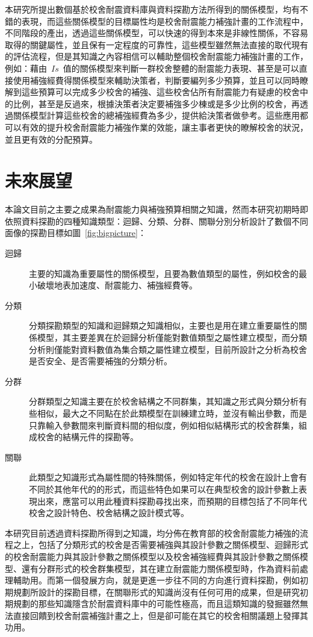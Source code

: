 本研究所提出數個基於校舍耐震資料庫與資料探勘方法所得到的關係模型，均有不錯的表現，而這些關係模型的目標屬性均是校舍耐震能力補強計畫的工作流程中，不同階段的產出，透過這些關係模型，可以快速的得到本來是非線性關係，不容易取得的關鍵屬性，並且保有一定程度的可靠性，這些模型雖然無法直接的取代現有的評估流程，但是其知識之內容相信可以輔助整個校舍耐震能力補強計畫的工作，例如：藉由~$Is$~值的關係模型來判斷一群校舍整體的耐震能力表現、甚至是可以直接使用補強經費得關係模型來輔助決策者，判斷要編列多少預算，並且可以同時瞭解到這些預算可以完成多少校舍的補強、這些校舍佔所有耐震能力有疑慮的校舍中的比例，甚至是反過來，根據決策者決定要補強多少棟或是多少比例的校舍，再透過關係模型計算這些校舍的總補強經費為多少，提供給決策者做參考。這些應用都可以有效的提升校舍耐震能力補強作業的效能，讓主事者更快的瞭解校舍的狀況，並且更有效的分配預算。

\section{未來展望} 

本論文目前之主要之成果為耐震能力與補強預算相關之知識，然而本研究初期時即依照資料探勘的四種知識類型：迴歸、分類、分群、關聯分別分析設計了數個不同面像的探勘目標如圖~\ref{fig:bigpicture}：

\begin{description}
  \item[迴歸]
  主要的知識為重要屬性的關係模型，且要為數值類型的屬性，例如校舍的最小破壞地表加速度、耐震能力、補強經費等。
  \item[分類]
  分類探勘類型的知識和迴歸類之知識相似，主要也是用在建立重要屬性的關係模型，其主要差異在於迴歸分析僅能對數值類型之屬性建立模型，而分類分析則僅能對資料數值為集合類之屬性建立模型，目前所設計之分析為校舍是否安全、是否需要補強的分類分析。
  \item[分群]
  分群類型之知識主要在於校舍結構之不同群集，其知識之形式與分類分析有些相似，最大之不同點在於此類模型在訓練建立時，並沒有輸出參數，而是只靠輸入參數間來判斷資料間的相似度，例如相似結構形式的校舍群集，組成校舍的結構元件的探勘等。
  \item[關聯]
  此類型之知識形式為屬性間的特殊關係，例如特定年代的校舍在設計上會有不同於其他年代的的形式，而這些特色如果可以在典型校舍的設計參數上表現出來，應當可以用此種資料探勘尋找出來，而預期的目標包括了不同年代校舍之設計特色、校舍結構之設計模式等。
\end{description}


本研究目前透過資料探勘所得到之知識，均分佈在教育部的校舍耐震能力補強的流程之上，包括了分類形式的校舍是否需要補強與其設計參數之關係模型、迴歸形式的校舍耐震能力與其設計參數之關係模型以及校舍補強經費與其設計參數之關係模型、還有分群形式的校舍群集模型，其在建立耐震能力關係模型時，作為資料前處理輔助用。而第一個發展方向，就是更進一步往不同的方向進行資料探勘，例如初期規劃所設計的探勘目標，在關聯形式的知識尚沒有任何可用的成果，但是研究初期規劃的那些知識隱含於耐震資料庫中的可能性極高，而且這類知識的發掘雖然無法直接回饋到校舍耐震補強計畫之上，但是卻可能在其它的校舍相關議題上發揮其功用。

